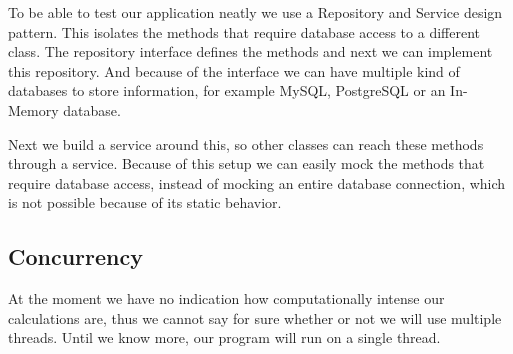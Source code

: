 		To be able to test our application neatly we use a Repository and Service design pattern. This isolates the methods that require database access to a different class. The repository interface defines the methods and next we can implement this repository. And because of the interface we can have multiple kind of databases to store information, for example MySQL, PostgreSQL or an In-Memory database. 
		
		Next we build a service around this, so other classes can reach these methods through a service. Because of this setup we can easily mock the methods that require database access, instead of mocking an entire database connection, which is not possible because of its static behavior.
	\subsection{Concurrency }
		At the moment we have no indication how computationally intense our calculations are, thus we cannot say for sure whether or not we will use multiple threads. Until we know more, our program will run on a single thread.
		
